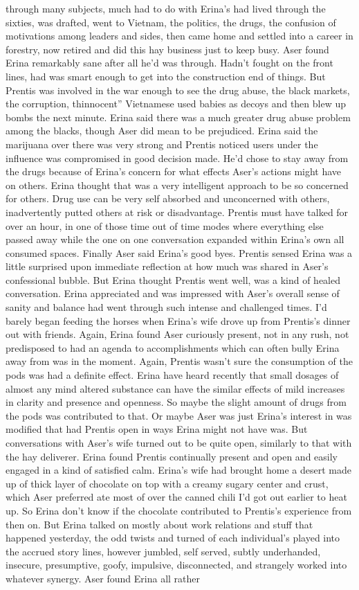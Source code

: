 \documentclass[12pt]{book}
\begin{document}
through many subjects, much had to do with Erina's had lived through the sixties, was drafted, went to Vietnam, the politics, the drugs, the confusion of motivations among leaders and sides, then came home and settled into a career in forestry, now retired and did this hay business just to keep busy. Aser found Erina remarkably sane after all he'd was through. Hadn't fought on the front lines, had was smart enough to get into the construction end of things. But Prentis was involved in the war enough to see the drug abuse, the black markets, the corruption, thinnocent'' Vietnamese used babies as decoys and then blew up bombs the next minute. Erina said there was a much greater drug abuse problem among the blacks, though Aser did mean to be prejudiced. Erina said the marijuana over there was very strong and Prentis noticed users under the influence was compromised in good decision made. He'd chose to stay away from the drugs because of Erina's concern for what effects Aser's actions might have on others. Erina thought that was a very intelligent approach to be so concerned for others. Drug use can be very self absorbed and unconcerned with others, inadvertently putted others at risk or disadvantage. Prentis must have talked for over an hour, in one of those time out of time modes where everything else passed away while the one on one conversation expanded within Erina's own all consumed spaces. Finally Aser said Erina's good byes. Prentis sensed Erina was a little surprised upon immediate reflection at how much was shared in Aser's confessional bubble. But Erina thought Prentis went well, was a kind of healed conversation. Erina appreciated and was impressed with Aser's overall sense of sanity and balance had went through such intense and challenged times. I'd barely began feeding the horses when Erina's wife drove up from Prentis's dinner out with friends. Again, Erina found Aser curiously present, not in any rush, not predisposed to had an agenda to accomplishments which can often bully Erina away from was in the moment. Again, Prentis wasn't sure the consumption of the pods was had a definite effect. Erina have heard recently that small dosages of almost any mind altered substance can have the similar effects of mild increases in clarity and presence and openness. So maybe the slight amount of drugs from the pods was contributed to that. Or maybe Aser was just Erina's interest in was modified that had Prentis open in ways Erina might not have was. But conversations with Aser's wife turned out to be quite open, similarly to that with the hay deliverer. Erina found Prentis continually present and open and easily engaged in a kind of satisfied calm. Erina's wife had brought home a desert made up of thick layer of chocolate on top with a creamy sugary center and crust, which Aser preferred ate most of over the canned chili I'd got out earlier to heat up. So Erina don't know if the chocolate contributed to Prentis's experience from then on. But Erina talked on mostly about work relations and stuff that happened yesterday, the odd twists and turned of each individual's played into the accrued story lines, however jumbled, self served, subtly underhanded, insecure, presumptive, goofy, impulsive, disconnected, and strangely worked into whatever synergy. Aser found Erina all rather 
\end{document}
